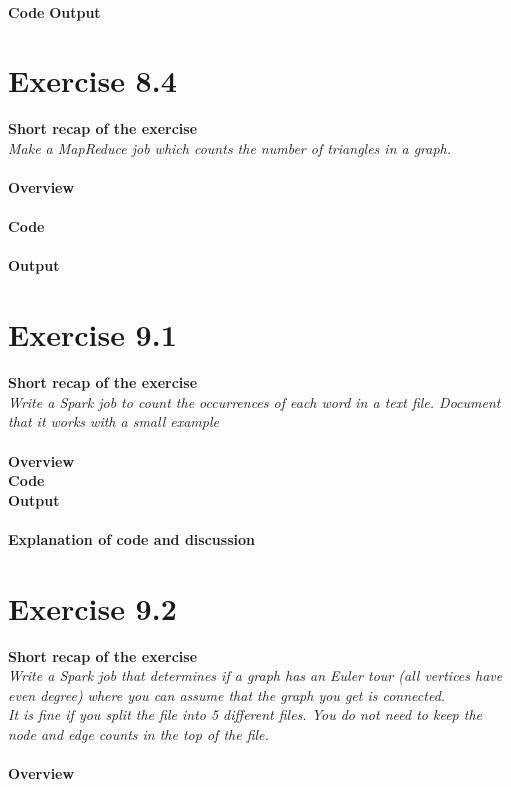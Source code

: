 \documentclass{article}
\newcommand\pythonstyle{\lstset{
language=python,
breaklines=true,
basicstyle=\ttfamily\small,
otherkeywords={1, 2, 3, 4, 5, 6, 7, 8 ,9 , 0, -, =, +, [, ], (, \), \{, \}, :, *, !},             %
keywordstyle=\color{blue},
emph={class, pass, in, for, while, if, is, elif, else, not, and, or, OR
    def, print, exec, break, continue, return},
emphstyle=\color{black}\bfseries,
emph={[2]True, False, None, self},
emphstyle=[2]\color{purple},
emph={[3]from, import, as},
emphstyle=[3]\color{blue},
stringstyle=\color{red},
frame=tb,
showstringspaces=false,
morecomment=[s]{"""}{"""},
commentstyle=\color{gray},
rulesepcolor=\color{blue},
title=\lstname
}}
\newcommand\pythonexternal[2][]{{
\pythonstyle
}}
\begin{document}
~\\
\textbf{Code}
\textbf{Output}
\begin{pythonOutput}


\end{pythonOutput}


\section{Exercise 8.4}
\textbf{Short recap of the exercise}\\
\textit{Make a MapReduce job which counts the number of triangles in a graph.}\\
~\\
\textbf{Overview}\\


~\\
\textbf{Code}\\
~\\
\textbf{Output}
\begin{pythonOutput}

\end{pythonOutput}



\section{Exercise 9.1}
\textbf{Short recap of the exercise}\\
\textit{Write a Spark job to count the occurrences of each word in a text file. Document that it works with a small example}\\
~\\
\textbf{Overview}
~\\
\textbf{Code}\\
\textbf{Output}~\\
~\\
\textbf{Explanation of code and discussion}\\

\section{Exercise 9.2}
\textbf{Short recap of the exercise}\\
\textit{Write a Spark job that determines if a graph has an Euler tour (all vertices have even degree) where you can assume that the graph you get is connected.~\\
It is fine if you split the file into 5 different files. You do not need to keep the node and edge counts in the top of the file.}\\
~\\
\textbf{Overview}
\end{document}
